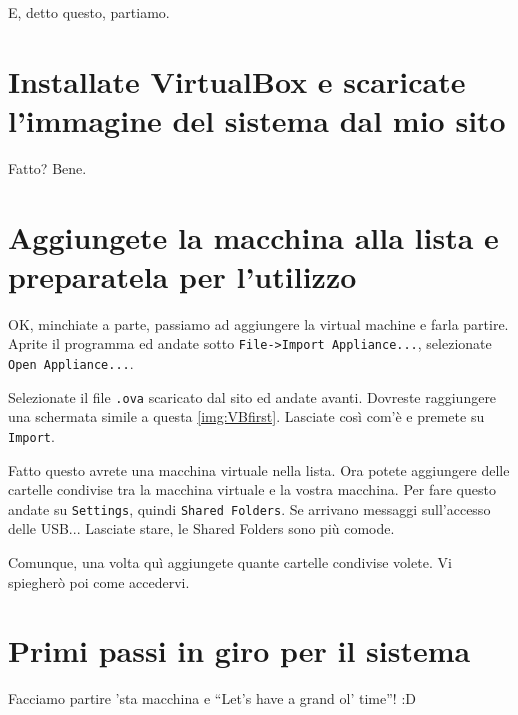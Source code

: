\documentclass[a4paper]{memoir}
\begin{document}
	
	E, detto questo, partiamo.
	
	\section*{Installate VirtualBox e scaricate l'immagine del sistema dal mio sito}
	
		Fatto? Bene.
		
	\section*{Aggiungete la macchina alla lista e preparatela per l'utilizzo}
		
		OK, minchiate a parte, passiamo ad aggiungere la virtual machine e farla partire. Aprite il programma
		ed andate sotto \texttt{File->Import Appliance...}, selezionate \texttt{Open Appliance...}.
		
		Selezionate il file \texttt{.ova} scaricato dal sito ed andate avanti. Dovreste raggiungere
		una schermata simile a questa \ref{img:VBfirst}. Lasciate così com'è e premete su \texttt{Import}.
		
		
		Fatto questo avrete una macchina virtuale nella lista. Ora potete aggiungere delle cartelle condivise
		tra la macchina virtuale e la vostra macchina. Per fare questo andate su \texttt{Settings}, quindi
		\texttt{Shared Folders}. Se arrivano messaggi sull'accesso delle USB... Lasciate stare, le Shared
		Folders sono più comode.
		
		Comunque, una volta quì aggiungete quante cartelle condivise volete. Vi spiegherò poi come accedervi.
		
	\section*{Primi passi in giro per il sistema}
	
		Facciamo partire 'sta macchina e ``Let's have a grand ol' time''! :D
	
\end{document}
